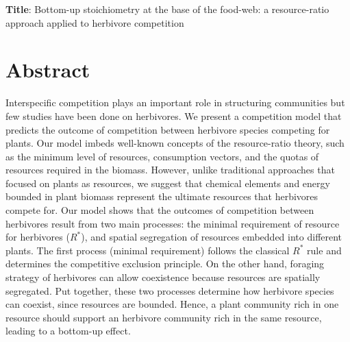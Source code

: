 \documentclass[12pt]{article}
\begin{document}
\begin{large}
\noindent \textbf{Title}: Bottom-up stoichiometry at the base of the food-web: a resource-ratio approach applied to herbivore competition  
\end{large}

\section*{Abstract}

Interspecific competition plays an important role in structuring communities but few studies have been done on herbivores. We present a competition model that predicts the outcome of competition between herbivore species competing for plants. Our model imbeds well-known concepts of the resource-ratio theory, such as the minimum level of resources, consumption vectors, and the quotas of resources required in the biomass. However, unlike traditional approaches that focused on plants as resources, we suggest that chemical elements and energy bounded in plant biomass represent the ultimate resources that herbivores compete for. Our model shows that the outcomes of competition between herbivores result from two main processes: the minimal requirement of resource for herbivores ($R^*$), and spatial segregation of resources embedded into different plants. The first process (minimal requirement) follows the classical $R^*$ rule and determines the competitive exclusion principle. On the other hand, foraging strategy of herbivores can allow coexistence because resources are spatially segregated. Put together, these two processes determine how herbivore species can coexist, since resources are bounded. Hence, a plant community rich in one resource should support an herbivore community rich in the same resource, leading to a bottom-up effect. 
\end{document}
